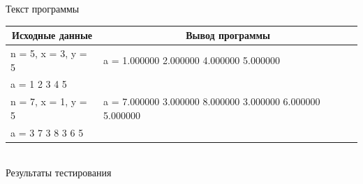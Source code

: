 \documentclass[a4paper,14pt]{extarticle}
\begin{document}

\begin{center}
Текст программы\\
\vspace{0.6cm}
\begin{tabular}{|l|l|}
\hline
\multicolumn{1}{|c|}{Исходные данные}& \multicolumn{1}{|c|}{Вывод программы}\\
\hline
n = 5, x = 3, y = 5 & a = 1.000000 2.000000 4.000000 5.000000 \\
a = 1 2 3 4 5 & \\
\hline
n = 7, x = 1, y = 5 & a = 7.000000 3.000000 8.000000 3.000000 6.000000 5.000000  \\
a = 3 7 3 8 3 6 5 & \\
\hline
\end{tabular}\\
\vspace{0.3cm}
Результаты тестирования
\end{center}
\end{document}

